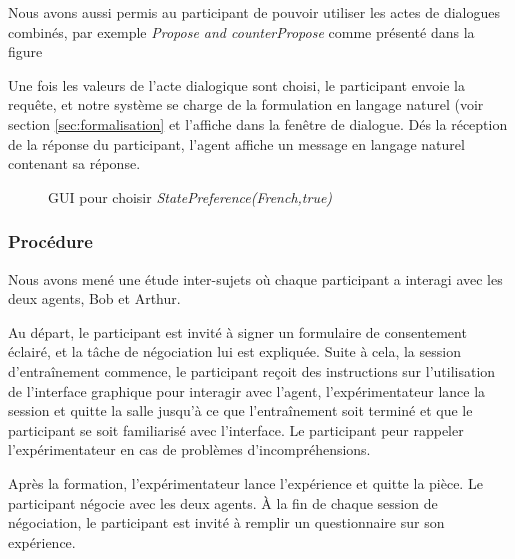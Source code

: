 {					Nous avons aussi permis au participant de pouvoir utiliser les actes de dialogues combinés, par exemple \emph{Propose and counterPropose} comme présenté dans la figure 
					
					Une fois les valeurs de l'acte dialogique sont choisi, le participant envoie la requête, et notre système se charge de la formulation en langage naturel (voir section \ref{sec:formalisation} et l'affiche dans la fenêtre de dialogue. Dés la réception de la réponse du participant, l'agent affiche un message en langage naturel contenant sa réponse. 
					
					
					
					\begin{figure}[b]
						\centering
						\caption{GUI pour choisir \emph{StatePreference(French,true)} }
						\label{fig:statIhm}
					\end{figure}
					
			\subsubsection{Procédure}
			
			Nous avons mené une étude inter-sujets où chaque participant a interagi avec les deux agents, Bob et Arthur.
			
			Au départ, le participant est invité à signer un formulaire de consentement éclairé, et  la tâche de négociation lui est expliquée. 
			Suite à cela, la  session d'entraînement commence, le participant reçoit des instructions sur l'utilisation de l'interface graphique pour interagir avec l'agent, l'expérimentateur lance la session et quitte la salle jusqu'à ce que l'entraînement soit terminé et que le participant se soit familiarisé avec l'interface. Le participant peur rappeler l'expérimentateur en cas de problèmes d'incompréhensions. 
			
			Après la formation, l'expérimentateur lance l'expérience et quitte la pièce. 
			Le participant négocie avec les deux agents. À la fin de chaque session de négociation, le participant est invité à remplir un questionnaire sur son expérience.
			
}
